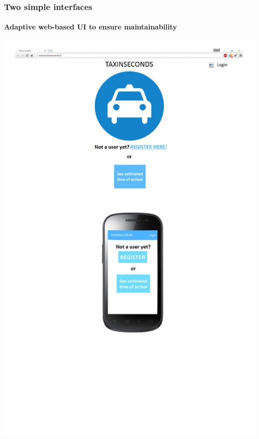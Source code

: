 \documentclass[10pt,xcolor={usenames,dvipsnames}]{beamer}
\begin{document}
\begin{frame}
	\frametitle{Two simple interfaces}
	\framesubtitle{Adaptive web-based UI to ensure maintainability}
	\begin{center}
		\includegraphics[width=\textwidth,height=\textheight,keepaspectratio]{GuestInterface}
	\end{center}
\end{frame}
\end{document}
